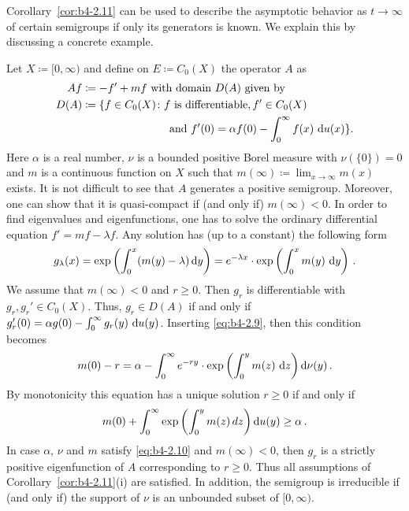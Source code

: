 Corollary~\ref{cor:b4-2.11} can be used to describe the asymptotic behavior as $t \to \infty$ of certain semigroups if only its generators is known. 
We explain this by discussing a concrete example.
\begin{example}\label{ex:b4-2.12}
	Let $X  \coloneq  [0,\infty)$ and define on $E  \coloneq  C_{0}(X)$ the operator $A$ as
	\begin{equation}\label{eq:b4-2.8}
		\begin{aligned}
		Af & \coloneq -f' + mf \text{ with domain } D(A) \text{ given by}	\\
		D(A) & \coloneq  \{f \in C_{0}(X) \colon f \text{ is differentiable}, f' \in C_{0}(X)\\
		& \phantom{aaaaaaaaaaaaaaa} \text{and } f'(0) = \alpha f(0) - \int_0^{\infty} f(x) \, \mathop{}\!\mathrm{d}{u}(x)
 \} \text{.}
		\end{aligned}
	\end{equation}
Here $\alpha$ is a real number, $\nu$ is a bounded positive Borel measure with $\nu(\{0\}) = 0$ and $m$ is a continuous function on $X$ such that $m(\infty)  \coloneq  \lim_{x \to \infty}m(x)$ exists. 
It is not difficult to see that $A$ generates a positive semigroup. 
Moreover, one can show that it is quasi-compact if (and only if) $m(\infty) < 0$. 
In order to find eigenvalues and eigenfunctions, one has to solve the ordinary differential equation $f' = mf - \lambda f$. 
Any solution has (up to a constant) the following form
\begin{equation}\label{eq:b4-2.9}
	g_{\lambda}(x) = \exp\left(\int_0^x(m(y) - \lambda)\mathop{}\!\mathrm{d}{y} \right) = e^{-\lambda x} \cdot \exp\left(\int_0^x m(y) \, \mathop{}\!\mathrm{d}{y} \right)\,.
\end{equation}
We assume that $m(\infty) < 0$ and $r \geq 0$. 
Then $g_r$ is differentiable with $g_r, g_r' \in C_{0}(X)$. 
Thus, $g_r \in D(A)$ if and only if $g_r'(0) = \alpha g(0) - \int_0^{\infty} g_r(y) \, \mathop{}\!\mathrm{d}{u}(y)$. 
Inserting \eqref{eq:b4-2.9}, then this condition becomes
\[
m(0) - r = \alpha - \int_0^{\infty} e^{-ry} \cdot \exp\left(\int_{0}^{y}  m(z) \,\mathop{}\!\mathrm{d}{z}\right)\mathop{}\!\mathrm{d}{\nu}(y)\,.
\]
By monotonicity this equation has a unique solution $r \geq 0$ if and only if
\begin{equation}\label{eq:b4-2.10}
	m(0) + \int_0^{\infty} \exp\left(\int_0^y m(z) \, dz\right)\mathop{}\!\mathrm{d}{u}(y) \geq \alpha\,.
\end{equation}
In case $\alpha$, $\nu$ and $m$ satisfy \eqref{eq:b4-2.10} and $m(\infty) < 0$, then $g_r$ is a strictly positive eigenfunction of $A$ corresponding to $r \geq 0$. 
Thus all assumptions of Corollary~\ref{cor:b4-2.11}(i) are satisfied. 
In addition, the semigroup is irreducible if (and only if) the support of $\nu$ is an unbounded subset of $[0,\infty)$.
\end{example}

